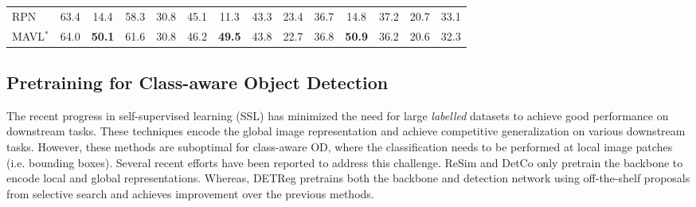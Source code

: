 \documentclass[runningheads]{llncs}
\begin{document}
\begin{table*}[!t]
\begin{center}
{\begin{tabular}{l|c|c|ccc|c|ccc|c|ccc}
\hline\hline
RPN & 63.4 & {\cellcolor{orange!6}} 14.4 & 58.3 & 30.8 & 45.1 & {\cellcolor{orange!6}} 11.3 & 43.3 & 23.4 & 36.7 & {\cellcolor{orange!6}} 14.8 & 37.2 & 20.7 & 33.1 \\
MAVL$^*$  & 64.0 & {\cellcolor{orange!6}} \textbf{50.1} & 61.6 & 30.8 & 46.2 & {\cellcolor{orange!6}} \textbf{49.5} & 43.8 & 22.7 & 36.8 & {\cellcolor{orange!6}} \textbf{50.9} & 36.2 & 20.6 & 32.3 \\
\bottomrule
\end{tabular}
}
\end{center}
\label{table7:owod}
\end{table*}

\subsection{Pretraining for Class-aware Object Detection}

\begin{wraptable}[8]{r}{6.5cm}
\caption{\small Effect of using MAVL proposals for pre-training of DETReg \cite{detreg} instead of Selective Search \cite{uijlings2013selective} proposals.}
\setlength{\tabcolsep}{4pt}
\label{table10:voc_results}
\end{wraptable}
The recent progress in self-supervised learning (SSL) \cite{PIRL,MoCo,SwAV,barlow_twins} has minimized the need for large \emph{labelled} datasets to achieve good performance on downstream tasks. These techniques encode the global image representation and achieve competitive generalization on various downstream tasks. However, these methods are suboptimal for class-aware OD, where the classification needs to be performed at local image patches (i.e. bounding boxes). Several recent efforts have been reported to address this challenge. ReSim \cite{xiao2021region} and DetCo \cite{xie2021detco} only pretrain the backbone to encode local and global representations. Whereas, DETReg \cite{detreg} pretrains both the backbone and detection network using off-the-shelf proposals from selective search \cite{uijlings2013selective} and achieves improvement over the previous methods. 
\end{document}
